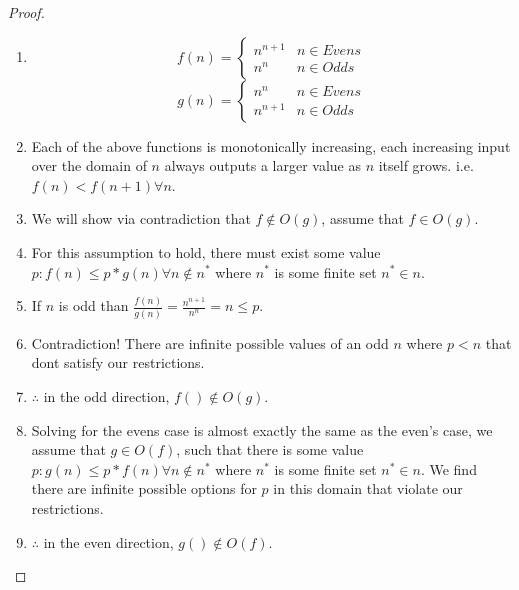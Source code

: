 \documentclass{article}
\begin{document}
\begin{proof}
\begin{enumerate}
            \item \[ f(n) =   \begin{cases}
                              n^{n+1} & n \in Evens \\
                              n^n     & n \in Odds
                        \end{cases}
                  \]
                  \[ g(n) =   \begin{cases}
                              n^n     & n \in Evens \\
                              n^{n+1} & n \in Odds
                        \end{cases}
                  \]
            \item Each of the above functions is monotonically increasing, each increasing
                  input over the domain of $n$ always outputs a larger value as $n$ itself
                  grows. i.e. $f(n) < f(n+1) \forall n$.
            \item We will show via contradiction that $f\notin O(g)$, assume that $f \in O(g)$.
            \item For this assumption to hold, there must exist some value $p: f(n) \leq
                        p*g(n) \forall n \notin {n^*}$ where $n^*$ is some finite set $n^* \in
                        n$.
            \item If $n$ is odd than $\frac{f(n)}{g(n)} = \frac{n^{n+1}}{n^n} = n \leq p$.
            \item Contradiction! There are infinite possible values of an odd $n$ where $p
                        < n$ that dont satisfy our restrictions.
            \item $\therefore$ in the odd direction, $f() \notin O(g)$.
            \item Solving for the evens case is almost exactly the same as the even's case, we assume
                  that $g \in O(f)$, such that there is some value $p: g(n) \leq
                        p*f(n) \forall n \notin {n^*}$ where $n^*$ is some finite set $n^* \in
                        n$. We find there are infinite possible options for $p$ in this domain that
                  violate our restrictions.
            \item $\therefore$ in the even direction, $g() \notin O(f)$.
      \end{enumerate}
\end{proof}
\end{document}

